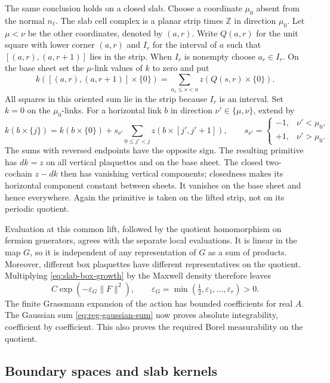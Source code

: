 \documentclass[11pt,letterpaper,reqno]{amsart}
\newcommand{\Z}{\mathbb Z}
\begin{document}
The same conclusion holds on a closed slab. Choose a coordinate
$\mu_0$ absent from the normal $n_\ell$. The slab cell complex is a
planar strip times $\Z$ in direction $\mu_0$.
Let $\mu<\nu$ be the other coordinates, denoted by $(a,r)$.
Write $Q(a,r)$ for the unit square with lower corner $(a,r)$ and
$I_r$ for the interval of $a$ such that $[(a,r),(a,r+1)]$ lies
in the strip. When $I_r$ is nonempty choose $a_r\in I_r$.
On the base sheet set the $\mu$-link values of $k$ to zero and put
\[
 k([(a,r),(a,r+1)]\times\{0\})
       =\sum_{a_r\le s<a}z(Q(s,r)\times\{0\}).
\]
All squares in this oriented sum lie in the strip because $I_r$
is an interval. Set $k=0$ on the $\mu_0$-links. For a horizontal
link $b$ in direction $\nu'\in\{\mu,\nu\}$, extend by
\[
 k(b\times\{j\})=k(b\times\{0\})
       +s_{\nu'}\sum_{0\le j'<j}z(b\times[j',j'+1]),
 \qquad
 s_{\nu'}=\begin{cases}-1,&\nu'<\mu_0,\\+1,&\nu'>\mu_0.\end{cases}
\]
The sums with reversed endpoints have the opposite sign.
The resulting primitive has $dk=z$ on all vertical
plaquettes and on the base sheet. The closed two-cochain $z-dk$ then
has vanishing vertical components; closedness makes its horizontal
component constant between sheets. It vanishes on the base sheet and
hence everywhere. Again the primitive is taken on the lifted strip,
not on its periodic quotient.

Evaluation at this common lift, followed by the quotient homomorphism
on fermion generators, agrees with the separate local evaluations.
It is linear in the map $G$, so it is independent of any representation
of $G$ as a sum of products. Moreover, different box plaquettes have
different representatives on the quotient. Multiplying
\eqref{eq:slab-box-growth} by the Maxwell density therefore leaves
\begin{equation}\label{eq:slab-local-majorant}
 C\exp(-\varepsilon_G\|F\|^2),\qquad
 \varepsilon_G=\min(\tfrac12,\varepsilon_1,\ldots,\varepsilon_r)>0.
\end{equation}
The finite Grassmann expansion of the action has bounded coefficients
for real $A$. The Gaussian sum \eqref{eq:reg-gaussian-sum} now proves
absolute integrability, coefficient by coefficient. This also proves
the required Borel measurability on the quotient.

\subsection{Boundary spaces and slab kernels}\label{subsec:slab-kernels}
\end{document}
